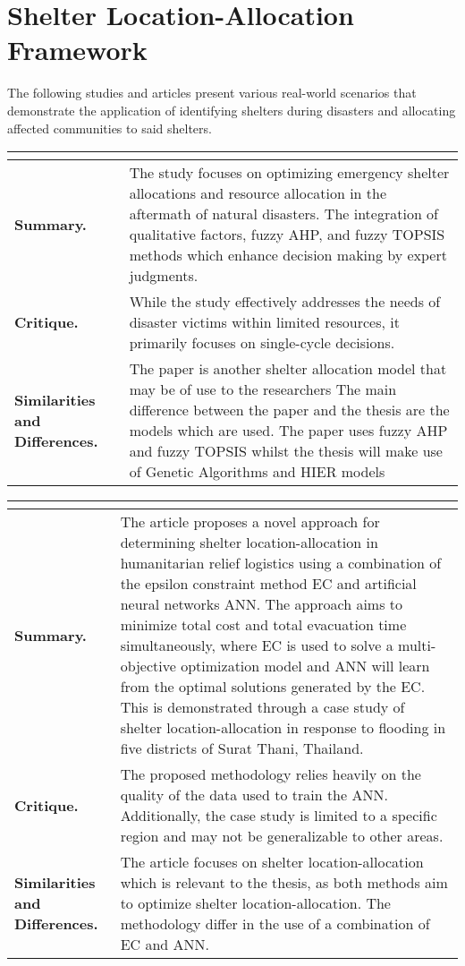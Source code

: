 \section{Shelter Location-Allocation Framework}

The following studies and articles present various real-world scenarios that demonstrate the application of identifying shelters during disasters and allocating affected communities to said shelters. 

\begin{longtable}{|L{.2\linewidth}|L{.74\linewidth}|}
	\hline
	\\ \hline
	\textbf{Summary.} & The study focuses on optimizing emergency shelter allocations and resource allocation in the aftermath of natural disasters. The integration of qualitative factors, fuzzy AHP, and fuzzy TOPSIS methods which enhance decision making by expert judgments.\\ \hline
	\textbf{Critique.} & While the study effectively addresses the needs of disaster victims within limited resources, it primarily focuses on single-cycle decisions.\\ \hline
	\textbf{Similarities and Differences.} & The paper is another shelter allocation model that may be of use to the researchers	The main difference between the paper and the thesis are the models which are used. The paper uses fuzzy AHP and fuzzy TOPSIS whilst the thesis will make use of Genetic Algorithms and HIER models \\ \hline
\end{longtable}

\begin{longtable}{|L{.2\linewidth}|L{.74\linewidth}|}
	\hline
	\\ \hline
	\textbf{Summary.} & The article proposes a novel approach for determining shelter location-allocation in humanitarian relief logistics using a combination of the epsilon constraint method EC and artificial neural networks ANN. The approach aims to minimize total cost and total evacuation time simultaneously, where EC is used  to solve a multi-objective optimization model and ANN will learn from the optimal solutions generated by the EC. This is demonstrated through a case study of shelter location-allocation in response to flooding in five districts of Surat Thani, Thailand.\\ \hline
	\textbf{Critique.} & The proposed methodology relies heavily on the quality of the data used to train the ANN. Additionally, the case study is limited to a specific region and may not be generalizable to other areas.\\ \hline
	\textbf{Similarities and Differences.} & The article focuses on shelter location-allocation which is relevant to the thesis, as both methods aim to optimize shelter location-allocation.	The methodology differ in the use of a combination of EC and ANN. \\ \hline
\end{longtable}

